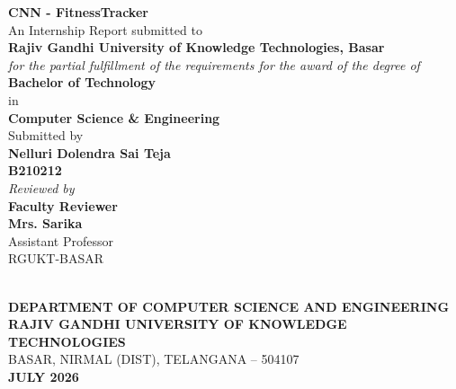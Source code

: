 \documentclass[12pt,a4paper]{report}
\begin{document}
\newpage
\thispagestyle{empty}
\begin{center}
\vspace*{0.5cm}
{\Large\bfseries CNN - FitnessTracker} \\[1.5cm]

{\large An Internship Report submitted to} \\[0.2cm]
{\large\bfseries Rajiv Gandhi University of Knowledge Technologies, Basar} \\[0.2cm]
{\large\itshape for the partial fulfillment of the requirements for the award of the degree of} \\[0.2cm]
{\large\bfseries Bachelor of Technology} \\[0.15cm]
{\large in} \\[0.15cm]
{\large\bfseries Computer Science \& Engineering} \\[1.2cm]

{\large Submitted by} \\[0.2cm]
{\large\bfseries Nelluri Dolendra Sai Teja} \\[0.15cm]
{\large\bfseries B210212} \\[1.2cm]

{\large\itshape Reviewed by} \\[0.4cm]
{\large\bfseries Faculty Reviewer} \\[0.2cm]
{\large\bfseries Mrs. Sarika} \\
Assistant Professor \\
RGUKT-BASAR \\[1.0cm]

 \\[0.8cm]

{\large\bfseries DEPARTMENT OF COMPUTER SCIENCE AND ENGINEERING} \\[0.15cm]
{\large\bfseries RAJIV GANDHI UNIVERSITY OF KNOWLEDGE TECHNOLOGIES} \\[0.15cm]
{\large BASAR, NIRMAL (DIST), TELANGANA -- 504107} \\[0.4cm]
{\large\bfseries JULY 2026}
\end{center}
\end{document}
